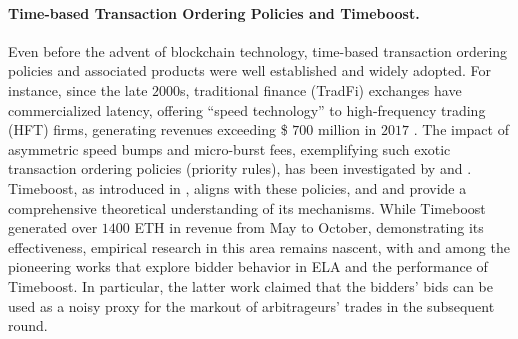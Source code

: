 \paragraph*{Time-based Transaction Ordering Policies and Timeboost.}
Even before the advent of blockchain technology, time-based transaction ordering policies and associated products were well established and widely adopted. For instance, since the late $2000$s, traditional finance (TradFi) exchanges have commercialized latency, offering ``speed technology'' to high-frequency trading (HFT) firms, generating revenues exceeding \$ $700$ million in $2017$ \cite{budish2024theory}. The impact of asymmetric speed bumps and micro-burst fees, exemplifying such exotic transaction ordering policies (priority rules), has been investigated by \cite{Aoyagi_2025} and \cite{brolley2023liquid}. Timeboost, as introduced in \cite{mamageishvili2023buying}, aligns with these policies, and \cite{akaki2025blind} and \cite{fritsch2024mev} provide a comprehensive theoretical understanding of its mechanisms. While Timeboost generated over $1400$ ETH in revenue from May to October, demonstrating its effectiveness, empirical research in this area remains nascent, with \cite{messias2025express} and \cite{mamageishvili2025timeboostaheadoftimeauctionswork} among the pioneering works that explore bidder behavior in ELA and the performance of Timeboost. In particular, the latter work claimed that the bidders' bids can be used as a noisy proxy for the markout of arbitrageurs' trades in the subsequent round.

